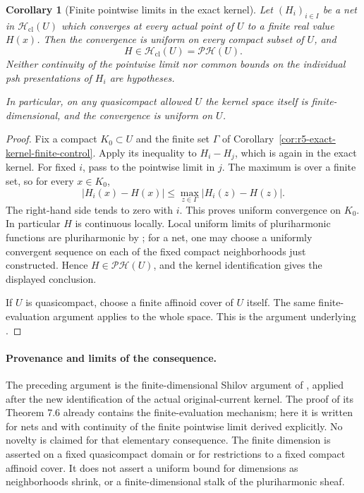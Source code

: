 \documentclass[11pt,a4paper]{article}
\numberwithin{equation}{section}
\newtheorem{corollary}[theorem]{Corollary}
\theoremstyle{definition}
\theoremstyle{remark}
\begin{document}
\begin{corollary}[Finite pointwise limits in the exact kernel]
\label{cor:r5-exact-kernel-pointwise-stability}
Let $(H_i)_{i\in I}$ be a net in
$\mathscr H_{\mathrm{cl}}(U)$ which converges at every actual
point of $U$ to a finite real value $H(x)$.  Then the convergence
is uniform on every compact subset of $U$, and
\[
                  H\in\mathscr H_{\mathrm{cl}}(U)
                       =\mathscr{PH}(U).
\]
Neither continuity of the pointwise limit nor common bounds on
the individual psh presentations of $H_i$ are hypotheses.

In particular, on any quasicompact allowed $U$ the kernel space
itself is finite-dimensional, and the convergence is uniform
on $U$.
\end{corollary}

\begin{proof}
Fix a compact $K_0\subset U$ and the finite set $\Gamma$ of
Corollary~\ref{cor:r5-exact-kernel-finite-control}.  Apply its
inequality to $H_i-H_j$, which is again in the exact kernel.
For fixed $i$, pass to the pointwise limit in $j$.  The maximum
is over a finite set, so for every $x\in K_0$,
\[
 |H_i(x)-H(x)|
       \leq\max_{z\in\Gamma}|H_i(z)-H(z)|.
\]
The right-hand side tends to zero with $i$.  This proves uniform
convergence on $K_0$.  In particular $H$ is continuous locally.
Local uniform limits of pluriharmonic functions are
pluriharmonic by \cite[Proposition 7.2(4)]{GR25}; for a net,
one may choose a uniformly convergent sequence on each of the
fixed compact neighborhoods just constructed.  Hence
$H\in\mathscr{PH}(U)$, and the kernel identification gives the
displayed conclusion.

If $U$ is quasicompact, choose a finite affinoid cover of $U$
itself.  The same finite-evaluation argument applies to the
whole space.  This is the argument underlying
\cite[Theorem 7.4]{GR25}.
\end{proof}

\paragraph{Provenance and limits of the consequence.}
The preceding argument is the finite-dimensional Shilov argument
of \cite[Proposition 7.3 and Theorems 7.4--7.6]{GR25}, applied
after the new identification of the actual original-current
kernel.  The proof of its Theorem 7.6 already contains the
finite-evaluation mechanism; here it is written for nets and
with continuity of the finite pointwise limit derived explicitly.
No novelty is claimed for that elementary consequence.
The finite dimension is asserted on a fixed quasicompact domain
or for restrictions to a fixed compact affinoid cover.  It does
not assert a uniform bound for dimensions as neighborhoods
shrink, or a finite-dimensional stalk of the pluriharmonic sheaf.
\end{document}
